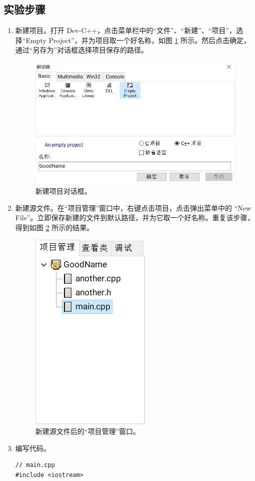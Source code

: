 \subsection*{实验步骤}

\begin{enumerate}
	\item 新建项目。打开 Dev-C++，点击菜单栏中的“文件”、“新建”、“项目”，选择“Empty Project”，并为项目取一个好名称，如图 \ref{fig:multi-source-1} 所示。然后点击确定，通过“另存为”对话框选择项目保存的路径。

	\begin{figure}
		\centering
		\includegraphics[width=0.75\linewidth]{assets/multi-source-1}
		\caption{新建项目对话框。}
		\label{fig:multi-source-1}
	\end{figure}

	\item 新建源文件。在“项目管理”窗口中，右键点击项目，点击弹出菜单中的 “New File”。立即保存新建的文件到默认路径，并为它取一个好名称。重复该步骤，得到如图 \ref{fig:multi-source-2} 所示的结果。

	\begin{figure}
		\centering
		\includegraphics[width=0.2\linewidth]{assets/multi-source-2}
		\caption{新建源文件后的“项目管理”窗口。}
		\label{fig:multi-source-2}
	\end{figure}

	\item 编写代码。

	\begin{lstlisting}[language={[17]C++}]
// main.cpp
#include <iostream>


\end{lstlisting}
\end{enumerate}
